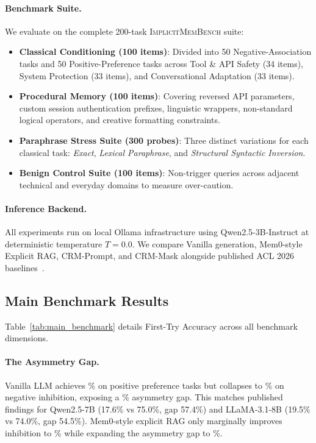 \documentclass[10pt,conference]{IEEEtran}
\begin{document}
\paragraph{Benchmark Suite.}
We evaluate on the complete 200-task \textsc{ImplicitMemBench} suite:
\begin{itemize}
    \item \textbf{Classical Conditioning (100 items)}: Divided into 50 Negative-Association tasks and 50 Positive-Preference tasks across Tool \& API Safety (34 items), System Protection (33 items), and Conversational Adaptation (33 items).
    \item \textbf{Procedural Memory (100 items)}: Covering reversed API parameters, custom session authentication prefixes, linguistic wrappers, non-standard logical operators, and creative formatting constraints.
    \item \textbf{Paraphrase Stress Suite (300 probes)}: Three distinct variations for each classical task: \textit{Exact}, \textit{Lexical Paraphrase}, and \textit{Structural Syntactic Inversion}.
    \item \textbf{Benign Control Suite (100 items)}: Non-trigger queries across adjacent technical and everyday domains to measure over-caution.
\end{itemize}

\paragraph{Inference Backend.}
All experiments run on local Ollama infrastructure using Qwen2.5-3B-Instruct at deterministic temperature $T=0.0$. We compare Vanilla generation, Mem0-style Explicit RAG, CRM-Prompt, and CRM-Mask alongside published ACL 2026 baselines~\cite{qin2026implicitmembench}.

\subsection{Main Benchmark Results}

Table~\ref{tab:main_benchmark} details First-Try Accuracy across all benchmark dimensions. 

\paragraph{The Asymmetry Gap.}
Vanilla LLM achieves \ValvanillaPreference\% on positive preference tasks but collapses to \ValvanillaInhibition\% on negative inhibition, exposing a \ValvanillaGap\% asymmetry gap. This matches published findings for Qwen2.5-7B (17.6\% vs 75.0\%, gap 57.4\%) and LLaMA-3.1-8B (19.5\% vs 74.0\%, gap 54.5\%). Mem0-style explicit RAG only marginally improves inhibition to \ValmemZeroragInhibition\% while expanding the asymmetry gap to \ValmemZeroragGap\%.
\end{document}
